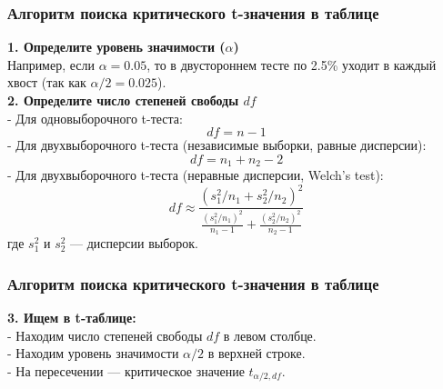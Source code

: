 \documentclass[aspectratio=169]{beamer}
\begin{document}
\begin{frame}
\frametitle{Алгоритм поиска критического t-значения в таблице}
{\bf 1. Определите уровень значимости (\(\alpha\))}\\
Например, если \(\alpha = 0.05\), то в двустороннем тесте по 2.5\% уходит в каждый хвост (так как \( \alpha/2 = 0.025 \)).
\newline\\
{\bf 2. Определите число степеней свободы \( df \)}\\
- Для одновыборочного t-теста:
     \[
     df = n - 1
     \]
- Для двухвыборочного t-теста (независимые выборки, равные дисперсии):
     \[
     df = n_1 + n_2 - 2
     \]
- Для двухвыборочного t-теста (неравные дисперсии, Welch’s test):  
     \[
     df \approx \frac{(s_1^2 / n_1 + s_2^2 / n_2)^2}{\frac{(s_1^2 / n_1)^2}{n_1 - 1} + \frac{(s_2^2 / n_2)^2}{n_2 - 1}}
     \]
     где \( s_1^2 \) и \( s_2^2 \) — дисперсии выборок.  
\end{frame}

\begin{frame}
\frametitle{Алгоритм поиска критического t-значения в таблице}
{\bf 3. Ищем в t-таблице:}\\
- Находим число степеней свободы \( df \) в левом столбце.\\
- Находим уровень значимости \( \alpha/2 \) в верхней строке.\\
- На пересечении — критическое значение \( t_{\alpha/2, df} \).  
\end{frame}
\end{document}
